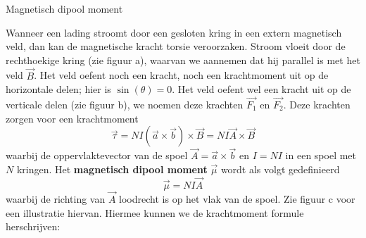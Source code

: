 \begin{theo}{Magnetisch dipool moment}

    \vspace{-0.45cm}
    \begin{minipage}{0.81\textwidth}
        Wanneer een lading stroomt door een gesloten kring in een extern magnetisch veld, dan kan de magnetische kracht torsie veroorzaken.
        Stroom vloeit door de rechthoekige kring (zie figuur a), waarvan we aannemen dat hij parallel is met het veld $\Vec{B}$.
        Het veld oefent noch een kracht, noch een krachtmoment uit op de horizontale delen; hier is $\sin(\theta) = 0$. Het veld oefent wel een kracht uit op de verticale delen
        (zie figuur b), we noemen deze krachten $\Vec{F_1}$ en $\Vec{F_2}$. Deze krachten zorgen voor een krachtmoment
        \begin{equation*}
            \Vec{\tau} = NI(\Vec{a} \times \Vec{b}) \times \Vec{B} = NI\Vec{A} \times \Vec{B}
        \end{equation*}
        waarbij de oppervlaktevector van de spoel $\Vec{A} = \Vec{a} \times \Vec{b}$ en $I = NI$ in een spoel met $N$ kringen.
        Het \textbf{magnetisch dipool moment} $\Vec{\mu}$ wordt als volgt gedefinieerd
        \begin{equation*}
            \Vec{\mu} = NI\Vec{A}
        \end{equation*}
        waarbij de richting van $\Vec{A}$ loodrecht is op het vlak van de spoel. Zie figuur c voor een illustratie hiervan. Hiermee kunnen we de krachtmoment formule herschrijven:

\end{minipage}
\end{theo}

